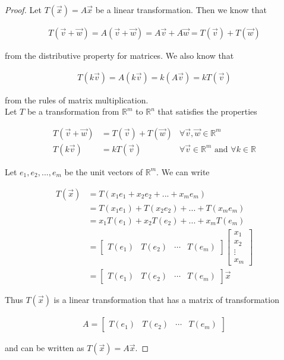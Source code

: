 \documentclass{article}
\begin{document}
\begin{proof}
Let $T(\vec{x}) = A\vec{x}$ be a linear transformation. Then we know that 
 
\begin{align*}
T(\vec{v} + \vec{w}) = A(\vec{v} + \vec{w}) = A\vec{v} + A\vec{w} = T(\vec{v}) + T(\vec{w})
\end{align*}

from the distributive property for matrices. We also know that 

\begin{align*}
T(k \vec{v}) = A(k \vec{v}) = k(A\vec{v}) = k T(\vec{v})
\end{align*}

from the rules of matrix multiplication. \\

Let $T$ be a transformation from $\mathbb{R}^m$ to $\mathbb{R}^n$ that satisfies the properties

\begin{align*}
T(\vec{v} + \vec{w}) &= T(\vec{v}) + T(\vec{w}) & \forall \vec{v}, \vec{w} \in \mathbb{R}^m \\
T(k\vec{v}) &= kT(\vec{v})  & \forall \vec{v} \in \mathbb{R}^m \textrm{ and } \forall k \in \mathbb{R}
\end{align*}

Let $e_{1},e_{2},...,e_{m}$ be the unit vectors of $\mathbb{R}^m$. We can write

\begin{align*}
T(\vec{x}) &= T(x_{1} e_{1} + x_{2} e_{2} + ... + x_{m} e_{m}) \\
&= T(x_{1} e_{1}) + T(x_{2} e_{2}) + ... + T(x_{m} e_{m}) \\
&= x_{1} T(e_{1}) + x_{2} T(e_{2}) + ... + x_{m} T(e_{m}) \\
&= \begin{bmatrix} T(e_{1}) & T(e_{2}) & \cdots & T(e_{m}) \end{bmatrix} \begin{bmatrix} x_{1} \\ x_{2} \\ \vdots \\ x_{m} \end{bmatrix} \\
&= \begin{bmatrix} T(e_{1}) & T(e_{2}) & \cdots & T(e_{m}) \end{bmatrix} \vec{x}
\end{align*}

Thus $T(\vec{x})$ is a linear transformation that has a matrix of transformation 

\begin{align*}
A = \begin{bmatrix} T(e_{1}) & T(e_{2}) & \cdots & T(e_{m}) \end{bmatrix}
\end{align*}

and can be written as $T(\vec{x}) = A\vec{x}$.

\end{proof}
\end{document}
